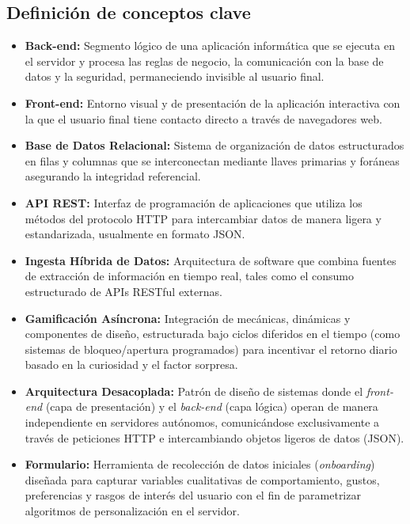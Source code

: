 \documentclass[12pt, atypical, journal]{article}
\begin{document}
\subsection{Definición de conceptos clave}
\begin{itemize}
   \item \textbf{Back-end:} Segmento lógico de una aplicación informática que se ejecuta en el servidor y procesa las reglas de negocio, la comunicación con la base de datos y la seguridad, permaneciendo invisible al usuario final.
   \item \textbf{Front-end:} Entorno visual y de presentación de la aplicación interactiva con la que el usuario final tiene contacto directo a través de navegadores web.
   \item \textbf{Base de Datos Relacional:} Sistema de organización de datos estructurados en filas y columnas que se interconectan mediante llaves primarias y foráneas asegurando la integridad referencial.
   \item \textbf{API REST:} Interfaz de programación de aplicaciones que utiliza los métodos del protocolo HTTP para intercambiar datos de manera ligera y estandarizada, usualmente en formato JSON.
   \item \textbf{Ingesta Híbrida de Datos:} Arquitectura de software que combina fuentes de extracción de información en tiempo real, tales como el consumo estructurado de APIs RESTful externas.
   \item \textbf{Gamificación Asíncrona:} Integración de mecánicas, dinámicas y componentes de diseño, estructurada bajo ciclos diferidos en el tiempo (como sistemas de bloqueo/apertura programados) para incentivar el retorno diario basado en la curiosidad y el factor sorpresa.
   \item \textbf{Arquitectura Desacoplada:} Patrón de diseño de sistemas donde el \textit{front-end} (capa de presentación) y el \textit{back-end} (capa lógica) operan de manera independiente en servidores autónomos, comunicándose exclusivamente a través de peticiones HTTP e intercambiando objetos ligeros de datos (JSON).
   \item \textbf{Formulario:} Herramienta de recolección de datos iniciales (\textit{onboarding}) diseñada para capturar variables cualitativas de comportamiento, gustos, preferencias y rasgos de interés del usuario con el fin de parametrizar algoritmos de personalización en el servidor.
\end{itemize}
\end{document}
